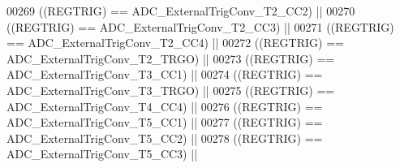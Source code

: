 \begin{DoxyCode}
00269                                   \textcolor{preprocessor}{(}\textcolor{preprocessor}{(}\textcolor{preprocessor}{REGTRIG}\textcolor{preprocessor}{)} \textcolor{preprocessor}{==} ADC_ExternalTrigConv_T2_CC2\textcolor{preprocessor}{)} \textcolor{preprocessor}{||}
00270                                   \textcolor{preprocessor}{(}\textcolor{preprocessor}{(}\textcolor{preprocessor}{REGTRIG}\textcolor{preprocessor}{)} \textcolor{preprocessor}{==} ADC_ExternalTrigConv_T2_CC3\textcolor{preprocessor}{)} \textcolor{preprocessor}{||}
00271                                   \textcolor{preprocessor}{(}\textcolor{preprocessor}{(}\textcolor{preprocessor}{REGTRIG}\textcolor{preprocessor}{)} \textcolor{preprocessor}{==} ADC_ExternalTrigConv_T2_CC4\textcolor{preprocessor}{)} \textcolor{preprocessor}{||}
00272                                   \textcolor{preprocessor}{(}\textcolor{preprocessor}{(}\textcolor{preprocessor}{REGTRIG}\textcolor{preprocessor}{)} \textcolor{preprocessor}{==} 
      ADC_ExternalTrigConv_T2_TRGO\textcolor{preprocessor}{)} \textcolor{preprocessor}{||}
00273                                   \textcolor{preprocessor}{(}\textcolor{preprocessor}{(}\textcolor{preprocessor}{REGTRIG}\textcolor{preprocessor}{)} \textcolor{preprocessor}{==} ADC_ExternalTrigConv_T3_CC1\textcolor{preprocessor}{)} \textcolor{preprocessor}{||}
00274                                   \textcolor{preprocessor}{(}\textcolor{preprocessor}{(}\textcolor{preprocessor}{REGTRIG}\textcolor{preprocessor}{)} \textcolor{preprocessor}{==} 
      ADC_ExternalTrigConv_T3_TRGO\textcolor{preprocessor}{)} \textcolor{preprocessor}{||}
00275                                   \textcolor{preprocessor}{(}\textcolor{preprocessor}{(}\textcolor{preprocessor}{REGTRIG}\textcolor{preprocessor}{)} \textcolor{preprocessor}{==} ADC_ExternalTrigConv_T4_CC4\textcolor{preprocessor}{)} \textcolor{preprocessor}{||}
00276                                   \textcolor{preprocessor}{(}\textcolor{preprocessor}{(}\textcolor{preprocessor}{REGTRIG}\textcolor{preprocessor}{)} \textcolor{preprocessor}{==} ADC_ExternalTrigConv_T5_CC1\textcolor{preprocessor}{)} \textcolor{preprocessor}{||}
00277                                   \textcolor{preprocessor}{(}\textcolor{preprocessor}{(}\textcolor{preprocessor}{REGTRIG}\textcolor{preprocessor}{)} \textcolor{preprocessor}{==} ADC_ExternalTrigConv_T5_CC2\textcolor{preprocessor}{)} \textcolor{preprocessor}{||}
00278                                   \textcolor{preprocessor}{(}\textcolor{preprocessor}{(}\textcolor{preprocessor}{REGTRIG}\textcolor{preprocessor}{)} \textcolor{preprocessor}{==} ADC_ExternalTrigConv_T5_CC3\textcolor{preprocessor}{)} \textcolor{preprocessor}{||}

\end{DoxyCode}
